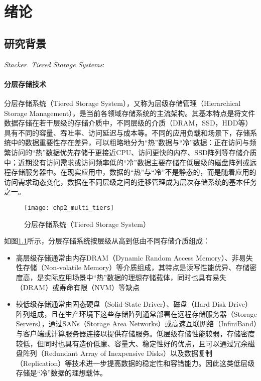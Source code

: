 \chapter{绪论}
\section{研究背景}
\textit{Stacker.}
\textit{Tiered Storage Systems}:
\subsubsection*{分层存储技术}
分层存储系统（Tiered Storage System），又称为层级存储管理（Hierarchical Storage Management），是当前各领域存储系统的主流架构。其基本特点是将文件数据存储在若干层级的存储介质中，不同层级的介质（DRAM，SSD，HDD等）具有不同的容量、吞吐率、访问延迟与成本等。不同的应用负载和场景下，存储系统中的数据重要性存在差异，可以粗略地分为“热”数据与“冷”数据：正在访问与频繁访问的“热”数据优先存储于更接近CPU、访问更快的内存、SSD阵列等存储介质中；近期没有访问需求或访问频率低的“冷”数据主要存储在低层级的磁盘阵列或远程存储服务器中。在现实应用中，数据的“热”与“冷”不是静态的，而是随着应用的访问需求动态变化，数据在不同层级之间的迁移管理成为层次存储系统的基本任务之一。
\begin{figure}[htp]
    \centering
    \texttt{[image: chp2\_multi\_tiers]}
    \caption{分层存储系统（Tiered Storage System）}
    \label{fig:multi_tiers}
\end{figure}
如图\ref{fig:multi_tiers}所示，分层存储系统按层级从高到低由不同存储介质组成：
\begin{itemize}
    \item 高层级存储通常由内存DRAM（Dynamic Random Access Memory）、非易失性存储（Non-volatile Memory）等介质组成，其特点是读写性能优异、存储密度高，是实际应用场景中“热”数据的理想存储载体，同时也具有易失（DRAM）或寿命有限（NVM）等缺点
    \item 较低级存储通常由固态硬盘（Solid-State Driver）、磁盘（Hard Disk Drive）阵列组成，且在生产环境下这些存储阵列通常部署在远程存储服务器（Storage Servers），通过SANs（Storage Area Networks）或高速互联网络（InfiniBand）与客户端或计算服务器连接以提供存储服务。低层级存储性能较弱，存储密度较低，但同时也具有造价低廉、容量大、稳定性好的优点，且可以通过冗余磁盘阵列（Redundant Array of Inexpensive Disks）以及数据复制（Replication）等技术进一步提高数据的稳定性和容错能力。因此这类低层级存储是“冷”数据的理想载体。
\end{itemize}


